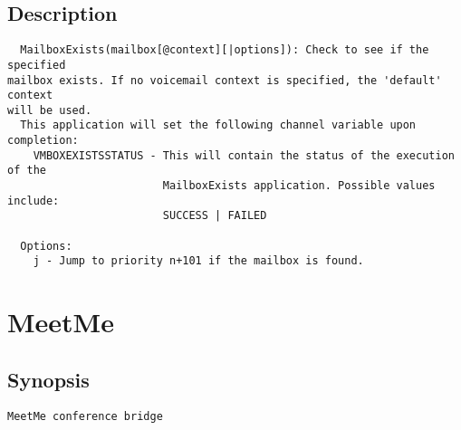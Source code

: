 \subsection{Description}
\begin{verbatim}
  MailboxExists(mailbox[@context][|options]): Check to see if the specified
mailbox exists. If no voicemail context is specified, the 'default' context
will be used.
  This application will set the following channel variable upon completion:
    VMBOXEXISTSSTATUS - This will contain the status of the execution of the
                        MailboxExists application. Possible values include:
                        SUCCESS | FAILED

  Options:
    j - Jump to priority n+101 if the mailbox is found.

\end{verbatim}


\section{MeetMe}
\subsection{Synopsis}
\begin{verbatim}
MeetMe conference bridge
\end{verbatim}

